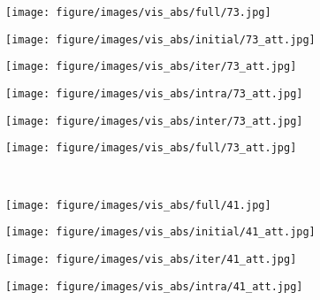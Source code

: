 \captionsetup[subfigure]{labelformat=empty} %
\begin{figure*}[t!]
\captionsetup[subfigure]{justification=centering}
\centering
    \begin{subfigure}[b]{.16\linewidth}
    \centering
    \texttt{[image: figure/images/vis\_abs/full/73.jpg]}
    \end{subfigure}
    \begin{subfigure}[b]{.16\linewidth}
    \centering
    \texttt{[image: figure/images/vis\_abs/initial/73\_att.jpg]}
    \end{subfigure}
    \begin{subfigure}[b]{.16\linewidth}
    \centering
    \texttt{[image: figure/images/vis\_abs/iter/73\_att.jpg]}
    \end{subfigure}  
    \begin{subfigure}[b]{.16\linewidth}
    \centering
    \texttt{[image: figure/images/vis\_abs/intra/73\_att.jpg]}
    \end{subfigure}
    \begin{subfigure}[b]{.16\linewidth}
    \centering
    \texttt{[image: figure/images/vis\_abs/inter/73\_att.jpg]}
    \end{subfigure}
    \begin{subfigure}[b]{.16\linewidth}
    \centering
    \texttt{[image: figure/images/vis\_abs/full/73\_att.jpg]}
    \end{subfigure}
    \\
    \begin{subfigure}[b]{.16\linewidth}
    \centering
    \texttt{[image: figure/images/vis\_abs/full/41.jpg]}
    \end{subfigure}
    \begin{subfigure}[b]{.16\linewidth}
    \centering
    \texttt{[image: figure/images/vis\_abs/initial/41\_att.jpg]}
    \end{subfigure}
    \begin{subfigure}[b]{.16\linewidth}
    \centering
    \texttt{[image: figure/images/vis\_abs/iter/41\_att.jpg]}
    \end{subfigure}  
    \begin{subfigure}[b]{.16\linewidth}
    \centering
    \texttt{[image: figure/images/vis\_abs/intra/41\_att.jpg]}
    \end{subfigure}
    \begin{subfigure}[b]{.16\linewidth}

\end{subfigure}
\end{figure*}
